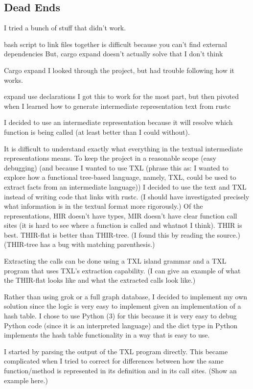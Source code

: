 \documentclass[11pt]{article}
\begin{document}
\subsection{Dead Ends}
I tried a bunch of stuff that didn't work.

bash script to link files together is difficult because you can't find external dependencies
But, cargo expand doesn't actually solve that I don't think

Cargo expand
I looked through the project, but had trouble following how it works.

expand use declarations
I got this to work for the most part, but then pivoted when I learned how to generate intermediate representation text from rustc

I decided to use an intermediate representation because it will resolve which function is being called (at least better than I could without).

It is difficult to understand exactly what everything in the textual intermediate representations means.
To keep the project in a reasonable scope (easy debugging) (and because I wanted to use TXL (phrase this as: I wanted to explore how a functional tree-based language, namely, TXL, could be used to extract facts from an intermediate language)) I decided to use the text and TXL instead of writing code that links with rustc.
(I should have investigated precisely what information is in the textual format more rigorously.)
Of the representations, HIR doesn't have types, MIR doesn't have clear function call sites (it is hard to see where a function is called and whatnot I think).
THIR is best.
THIR-flat is better than THIR-tree. (I found this by reading the source.)
(THIR-tree has a bug with matching parenthesis.)

Extracting the calls can be done using a TXL island grammar and a TXL program that uses TXL's extraction capability.
(I can give an example of what the THIR-flat looks like and what the extracted calls look like.)

Rather than using grok or a full graph database, I decided to implement my own solution since the logic is very easy to implement given an implementation of a hash table.
I chose to use Python (3) for this because it is very easy to debug Python code (since it is an interpreted language) and the dict type in Python implements the hash table functionality in a way that is easy to use.

I started by parsing the output of the TXL program directly.
This became complicated when I tried to correct for differences between how the same function/method is represented in its definition and in its call sites.
(Show an example here.)
\end{document}
